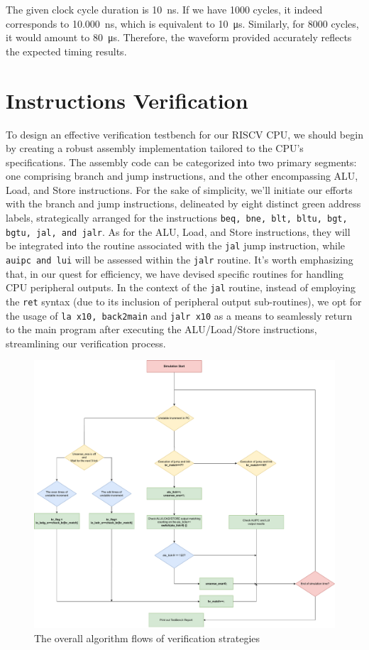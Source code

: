 \documentclass[12pt,a4paper,oneside]{book} %
\begin{document}
The given clock cycle duration is \SI{10}{\nano\second}. If we have 1000 cycles, it indeed corresponds to \SI{10,000}{\nano\second}, which is equivalent to \SI{10}{\micro\second}. Similarly, for 8000 cycles, it would amount to \SI{80}{\micro\second}. Therefore, the waveform provided accurately reflects the expected timing results.

\section{Instructions Verification}
To design an effective verification testbench for our RISCV CPU, we should begin by creating a robust assembly implementation tailored to the CPU's specifications. The assembly code can be categorized into two primary segments: one comprising branch and jump instructions, and the other encompassing ALU, Load, and Store instructions. For the sake of simplicity, we'll initiate our efforts with the branch and jump instructions, delineated by eight distinct green address labels, strategically arranged for the instructions \texttt{beq, bne, blt, bltu, bgt, bgtu, jal, and jalr}. As for the ALU, Load, and Store instructions, they will be integrated into the routine associated with the \texttt{jal} jump instruction, while \texttt{auipc and lui} will be assessed within the \texttt{jalr} routine. It's worth emphasizing that, in our quest for efficiency, we have devised specific routines for handling CPU peripheral outputs. In the context of the \texttt{jal} routine, instead of employing the \texttt{ret} syntax (due to its inclusion of peripheral output sub-routines), we opt for the usage of \texttt{la x10, back2main} and \texttt{jalr x10} as a means to seamlessly return to the main program after executing the ALU/Load/Store instructions, streamlining our verification process.

 \begin{figure}[H]
    \begin{center}
    \includegraphics[trim=0cm 0cm 0cm 0cm,clip,width=.9\textwidth]{images/testbench_af.drawio.pdf}
    \caption{The overall algorithm flows of verification strategies}
    \end{center}
\end{figure}
\end{document}

